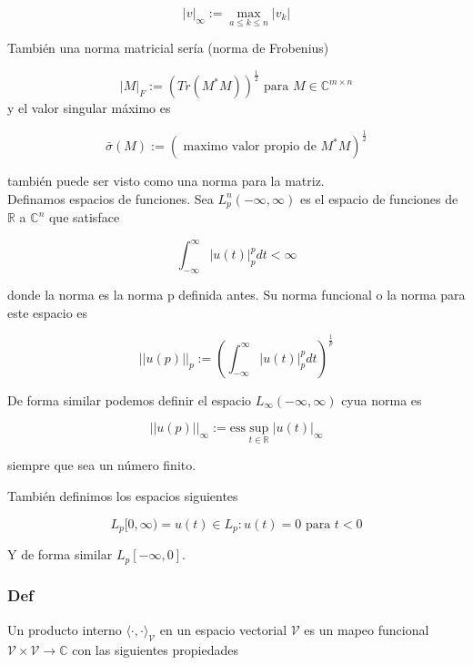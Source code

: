 \begin{equation*}
    |v|_{\infty} := \max_{a \leq k \leq n} |v_k|
\end{equation*}

También una norma matricial sería (norma de Frobenius)


\begin{equation*}
|M|_F := (Tr(M^{*}M))^{\frac{1}{2}} \text{ para } M \in \mathbb{C}^{m \times n}
\end{equation*}
y el valor singular máximo es

\begin{equation*}
    \bar{\sigma}(M) := (\text{ maximo valor propio de } M^{*}M )^{\frac{1}{2}}
\end{equation*}

también puede ser visto como una norma para la matriz. \\

Definamos espacios de funciones. Sea $L_p^n (-\infty,\infty)$ es el espacio de funciones de $\mathbb{R}$ a $\mathbb{C}^n$ que satisface

\begin{equation*}
    \int_{-\infty}^{\infty} |u(t)|_p^{p} dt < \infty
\end{equation*}

donde la norma es la norma p definida antes. Su norma funcional o la norma para este espacio es

\begin{equation*}
    ||u(p)||_p := \left(\int_{-\infty}^{\infty} |u(t)|_p^{p} dt \right)^{\frac{1}{p}}
\end{equation*}

De forma similar podemos definir el espacio $L_\infty (-\infty,\infty)$ cyua norma es

\begin{equation*}
     ||u(p)||_\infty := \text{ess} \sup_{t \in \mathbb{R}} |u(t)|_{\infty}
\end{equation*}

siempre que sea un número finito.

También definimos los espacios siguientes

\begin{equation*}
    L_p[0,\infty) = {u(t) \in L_p : u(t)=0 \text{ para } t < 0}
\end{equation*}

Y de forma similar $L_p[-\infty,0]$.

\subsubsection{Def} Un producto interno $\langle \cdot,\cdot \rangle_\mathcal{V} $ en un espacio vectorial $\mathcal{V}$ es un mapeo funcional $\mathcal{V} \times \mathcal{V} \to \mathbb{C}$ con las siguientes propiedades

